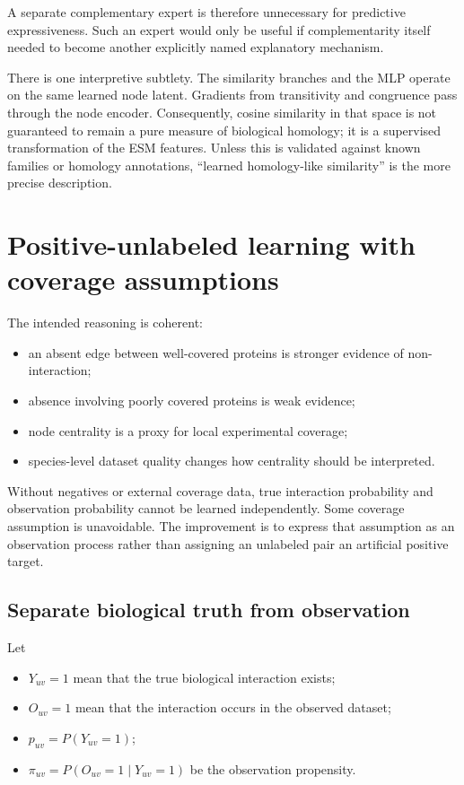 \documentclass[11pt,a4paper]{article}
\begin{document}
A separate complementary expert is therefore unnecessary for predictive
expressiveness. Such an expert would only be useful if complementarity itself
needed to become another explicitly named explanatory mechanism.

There is one interpretive subtlety. The similarity branches and the MLP operate
on the same learned node latent. Gradients from transitivity and congruence pass
through the node encoder. Consequently, cosine similarity in that space is not
guaranteed to remain a pure measure of biological homology; it is a supervised
transformation of the ESM features. Unless this is validated against known
families or homology annotations, ``learned homology-like similarity'' is the
more precise description.

\section{Positive-unlabeled learning with coverage assumptions}

The intended reasoning is coherent:

\begin{itemize}
  \item an absent edge between well-covered proteins is stronger evidence of
        non-interaction;
  \item absence involving poorly covered proteins is weak evidence;
  \item node centrality is a proxy for local experimental coverage;
  \item species-level dataset quality changes how centrality should be
        interpreted.
\end{itemize}

Without negatives or external coverage data, true interaction probability and
observation probability cannot be learned independently. Some coverage
assumption is unavoidable. The improvement is to express that assumption as an
observation process rather than assigning an unlabeled pair an artificial
positive target.

\subsection{Separate biological truth from observation}

Let

\begin{itemize}
  \item $Y_{uv}=1$ mean that the true biological interaction exists;
  \item $O_{uv}=1$ mean that the interaction occurs in the observed dataset;
  \item $p_{uv}=P(Y_{uv}=1)$;
  \item $\pi_{uv}=P(O_{uv}=1\mid Y_{uv}=1)$ be the observation propensity.
\end{itemize}
\end{document}
